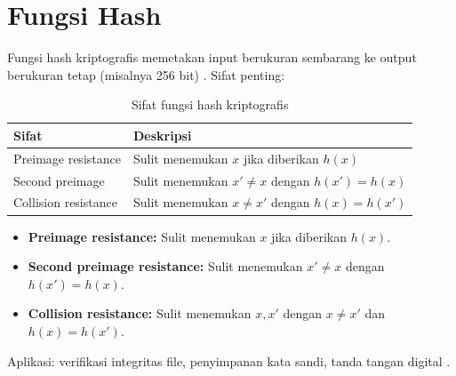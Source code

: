 \section{Fungsi Hash}

Fungsi hash kriptografis memetakan input berukuran sembarang ke output berukuran tetap (misalnya 256 bit) \cite{katz2020,menezes1996}. Sifat penting:

\begin{table}[!htbp]
\centering
\caption{Sifat fungsi hash kriptografis}
\label{tab:hash-sifat}
\begin{tabular}{@{}ll@{}}
\toprule
\textbf{Sifat} & \textbf{Deskripsi} \\
\midrule
Preimage resistance & Sulit menemukan $x$ jika diberikan $h(x)$ \\
Second preimage & Sulit menemukan $x' \neq x$ dengan $h(x') = h(x)$ \\
Collision resistance & Sulit menemukan $x \neq x'$ dengan $h(x) = h(x')$ \\
\bottomrule
\end{tabular}
\end{table}

\begin{itemize}
\item \textbf{Preimage resistance:} Sulit menemukan $x$ jika diberikan $h(x)$.
\item \textbf{Second preimage resistance:} Sulit menemukan $x' \neq x$ dengan $h(x') = h(x)$.
\item \textbf{Collision resistance:} Sulit menemukan $x, x'$ dengan $x \neq x'$ dan $h(x) = h(x')$.
\end{itemize}

Aplikasi: verifikasi integritas file, penyimpanan kata sandi, tanda tangan digital \cite{katz2020,menezes1996}.
